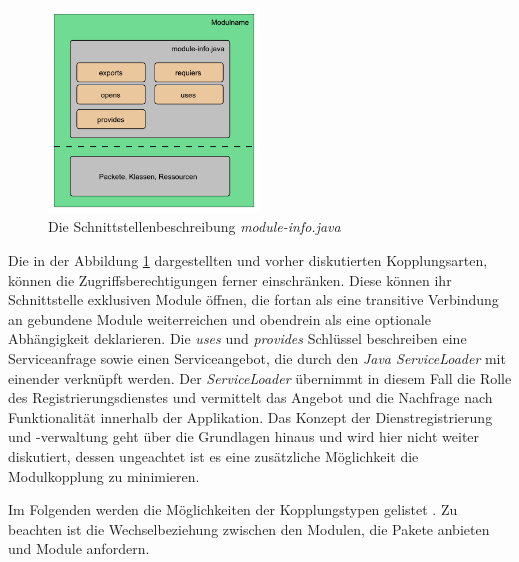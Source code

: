     \begin{figure}[h!]
      \centering
      \includegraphics[width=0.5\textwidth]{material/images/module-info.pdf}
      \caption{Die Schnittstellenbeschreibung \textit{module-info.java}}
      \label{fig:module-info}
    \end{figure}

    Die in der Abbildung \ref{fig:module-info} dargestellten und vorher diskutierten Kopplungsarten, können die Zugriffsberechtigungen ferner einschränken. Diese können ihr Schnittstelle exklusiven Module öffnen, die fortan als eine transitive Verbindung an gebundene Module weiterreichen und obendrein als eine optionale Abhängigkeit deklarieren. Die \textit{uses} und \textit{provides} Schlüssel beschreiben eine Serviceanfrage sowie einen Serviceangebot, die durch den \textit{Java ServiceLoader} mit einender verknüpft werden.\newline
    Der \textit{ServiceLoader} übernimmt in diesem Fall die Rolle des Registrierungsdienstes und vermittelt das Angebot und die Nachfrage nach Funktionalität innerhalb der Applikation. Das Konzept der Dienstregistrierung und -verwaltung geht über die Grundlagen hinaus und wird hier nicht weiter diskutiert, dessen ungeachtet ist es eine zusätzliche Möglichkeit die Modulkopplung zu minimieren. \cite{softModDes,modulMitJava9} \bigbreak
    
    Im Folgenden werden die Möglichkeiten der Kopplungstypen gelistet \cite{jmsOracle}. Zu beachten ist die Wechselbeziehung zwischen den Modulen, die Pakete anbieten und Module anfordern. 

